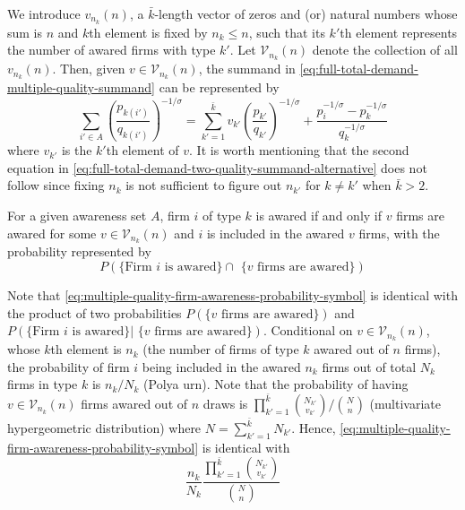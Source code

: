 \documentclass[12pt]{article}
\begin{document}
We introduce $v_{n_k} (n)$, a ${\bar k}$-length vector of zeros and (or) natural numbers whose sum is $n$ and $k$th element is fixed by $n_k \leq n$, such that its $k'$th element represents the number of awared firms with type $k'$. Let $\mathcal{V}_{n_k} (n)$ denote the collection of all $v_{n_k} (n)$. Then, given $v \in \mathcal{V}_{n_k} (n)$, the summand in \eqref{eq:full-total-demand-multiple-quality-summand} can be represented by
\begin{equation}
\sum_{i'\in A}\left( \frac{p_{k(i')}}{q_{k(i')}}\right)^{-1/\sigma} = 
\sum_{k' =1 }^{{\bar k}} v_{k'} \left( \dfrac{p_{k'}}{q_{k'}}  \right)^{-1/\sigma} +   
\dfrac{p_i^{-1/\sigma}   - p^{-1/\sigma}_{k} }{{ q_k^{-1/\sigma }}}
\label{eq:full-total-demand-multiple-quality-summand-alternative}
\end{equation}
where $v_{k'}$ is the $k'$th element of $v$. It is worth mentioning that the second equation in \eqref{eq:full-total-demand-two-quality-summand-alternative} does not follow since fixing $n_k$ is not sufficient to figure out $n_{k'}$ for $k \neq k'$ when ${\bar k} > 2$.

For a given awareness set $A$, firm $i$ of type $k$ is awared if and only if $v$ firms are awared for some $v \in \mathcal{V}_{n_k} (n)$ and $i$ is included in the awared $v$ firms, with the probability represented by
\begin{equation}\label{eq:multiple-quality-firm-awareness-probability-symbol}
P( \text{\{Firm $i$ is awared\} $\cap$ \{$v$ firms are awared\}})
\end{equation}

Note that  \eqref{eq:multiple-quality-firm-awareness-probability-symbol} is identical with the product of two probabilities $P( \text{\{$v$ firms are awared\}}) $ and $P( \text{\{Firm $i$ is awared\} | \{$v$ firms are awared\}})$. Conditional on $v \in \mathcal{V}_{n_k} (n)$, whose $k$th element is $n_k$ (the number of firms of type $k$ awared out of $n$ firms), the probability of firm $i$ being included in the awared $n_k$ firms out of total $N_k$ firms in type $k$ is $n_k / N_k$ (Polya urn). Note that the probability of having $v \in \mathcal{V}_{n_k}(n)$ firms awared out of $n$ draws is $\prod_{k'=1}^{\bar k} \binom{ N_{k'} }{ v_{k'} } / \binom{N}{n}$ (multivariate hypergeometric distribution) where $N = \sum_{k'=1}^{\bar k} N_{k'}$. Hence,  \eqref{eq:multiple-quality-firm-awareness-probability-symbol} is identical with
\begin{equation}\label{eq:multiple-quality-firm-awareness-probability}
\dfrac{n_k}{N_k}
\dfrac{\prod_{k'=1}^{\bar k} \binom{ N_{k'} }{ v_{k'} } }{\binom{N}{n}}
\end{equation}
\end{document}
